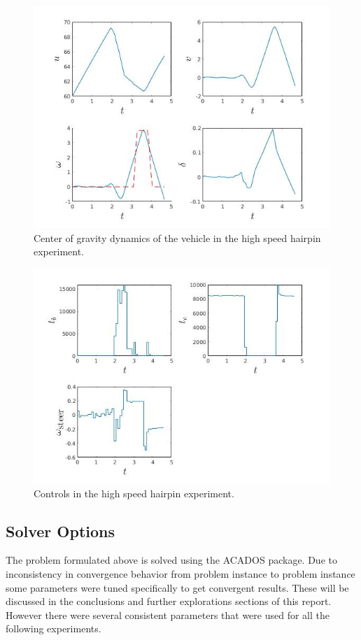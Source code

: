 \documentclass[conference,11pt]{IEEEtran}
\begin{document}
\begin{figure}[t]
  \centering
  \includegraphics[scale=0.5]{hairpin_brake_cg.jpg}
  \caption{Center of gravity dynamics of the vehicle in the high speed hairpin experiment.}
  \label{fig:cg}
\end{figure}
\begin{figure}[b]
  \centering
  \includegraphics[scale=0.5]{hairpin_brake_u.jpg}
  \caption{Controls in the high speed hairpin experiment.}
  \label{fig:cg}
\end{figure}
\subsection{Solver Options}
The problem formulated above is solved using the ACADOS package. Due to inconsistency in convergence behavior from problem instance to problem instance some parameters were tuned specifically to
get convergent results. These will be discussed in the conclusions and further explorations sections of this report. However there were several consistent parameters that were used for
all the following experiments.
\end{document}
